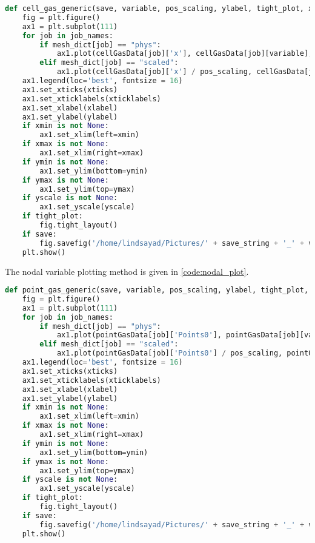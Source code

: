 \begin{lstlisting}[language=Python, caption = Generic elemental variable plotting method. Argument description given in \cref{list:plot_args}, label = code:elem_plot]
def cell_gas_generic(save, variable, pos_scaling, ylabel, tight_plot, xticks, xticklabels, xlabel, xmin=None, xmax=None, ymin=None, ymax=None, yscale=None, save_string="dummy"):
    fig = plt.figure()
    ax1 = plt.subplot(111)
    for job in job_names:
        if mesh_dict[job] == "phys":
            ax1.plot(cellGasData[job]['x'], cellGasData[job][variable], color = label_dict[job], linestyle = style_dict[job], label = name_dict[job], linewidth=2)
        elif mesh_dict[job] == "scaled":
            ax1.plot(cellGasData[job]['x'] / pos_scaling, cellGasData[job][variable], color = label_dict[job], linestyle = style_dict[job], label = name_dict[job], linewidth=2)
    ax1.legend(loc='best', fontsize = 16)
    ax1.set_xticks(xticks)
    ax1.set_xticklabels(xticklabels)
    ax1.set_xlabel(xlabel)
    ax1.set_ylabel(ylabel)
    if xmin is not None:
        ax1.set_xlim(left=xmin)
    if xmax is not None:
        ax1.set_xlim(right=xmax)
    if ymin is not None:
        ax1.set_ylim(bottom=ymin)
    if ymax is not None:
        ax1.set_ylim(top=ymax)
    if yscale is not None:
        ax1.set_yscale(yscale)
    if tight_plot:
        fig.tight_layout()
    if save:
        fig.savefig('/home/lindsayad/Pictures/' + save_string + '_' + variable + '.eps', format='eps')
    plt.show()
\end{lstlisting}

The nodal variable plotting method is given in \cref{code:nodal_plot}.

\begin{lstlisting}[language=Python, caption = Generic nodal variable plotting method. Argument description given in \cref{list:plot_args}, label = code:nodal_plot]
def point_gas_generic(save, variable, pos_scaling, ylabel, tight_plot, xticks, xticklabels, xlabel, xmin=None, xmax=None, ymin=None, ymax=None, yscale=None, save_string="dummy"):
    fig = plt.figure()
    ax1 = plt.subplot(111)
    for job in job_names:
        if mesh_dict[job] == "phys":
            ax1.plot(pointGasData[job]['Points0'], pointGasData[job][variable], color = label_dict[job], linestyle = style_dict[job], label = name_dict[job], linewidth=2)
        elif mesh_dict[job] == "scaled":
            ax1.plot(pointGasData[job]['Points0'] / pos_scaling, pointGasData[job][variable], color = label_dict[job], linestyle = style_dict[job], label = name_dict[job], linewidth=2)
    ax1.legend(loc='best', fontsize = 16)
    ax1.set_xticks(xticks)
    ax1.set_xticklabels(xticklabels)
    ax1.set_xlabel(xlabel)
    ax1.set_ylabel(ylabel)
    if xmin is not None:
        ax1.set_xlim(left=xmin)
    if xmax is not None:
        ax1.set_xlim(right=xmax)
    if ymin is not None:
        ax1.set_ylim(bottom=ymin)
    if ymax is not None:
        ax1.set_ylim(top=ymax)
    if yscale is not None:
        ax1.set_yscale(yscale)
    if tight_plot:
        fig.tight_layout()
    if save:
        fig.savefig('/home/lindsayad/Pictures/' + save_string + '_' + variable + '.eps', format='eps')
    plt.show()
\end{lstlisting}
